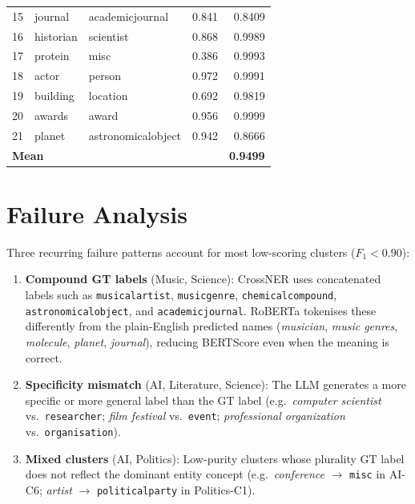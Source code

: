 \documentclass[11pt,a4paper]{article}
\begin{document}
\begin{table}[ht]
\begin{tabular}{r l l r r}
  15 & journal                        & academicjournal        & 0.841 & \cellcolor{red!15}0.8409 \\
  16 & historian                      & scientist              & 0.868 & \cellcolor{green!15}0.9989 \\
  17 & protein                        & misc                   & 0.386 & \cellcolor{green!15}0.9993 \\
  18 & actor                          & person                 & 0.972 & \cellcolor{green!15}0.9991 \\
  19 & building                       & location               & 0.692 & \cellcolor{yellow!25}0.9819 \\
  20 & awards                         & award                  & 0.956 & \cellcolor{green!15}0.9999 \\
  21 & planet                         & astronomicalobject     & 0.942 & \cellcolor{red!15}0.8666 \\
\midrule
\multicolumn{3}{l}{\textbf{Mean}} & & \textbf{0.9499} \\
\bottomrule
\end{tabular}
\end{table}

\FloatBarrier

\section{Failure Analysis}

Three recurring failure patterns account for most low-scoring clusters ($F_1 < 0.90$):

\begin{enumerate}
  \item \textbf{Compound GT labels} (Music, Science): CrossNER uses concatenated labels
        such as \texttt{musicalartist}, \texttt{musicgenre}, \texttt{chemicalcompound},
        \texttt{astronomicalobject}, and \texttt{academicjournal}.
        RoBERTa tokenises these differently from the plain-English predicted names
        (\textit{musician}, \textit{music genres}, \textit{molecule}, \textit{planet},
        \textit{journal}), reducing BERTScore even when the meaning is correct.

  \item \textbf{Specificity mismatch} (AI, Literature, Science): The LLM generates a
        more specific or more general label than the GT label
        (e.g.\ \textit{computer scientist} vs.\ \texttt{researcher};
        \textit{film festival} vs.\ \texttt{event};
        \textit{professional organization} vs.\ \texttt{organisation}).

  \item \textbf{Mixed clusters} (AI, Politics): Low-purity clusters whose plurality
        GT label does not reflect the dominant entity concept
        (e.g.\ \textit{conference} $\to$ \texttt{misc} in AI-C6;
        \textit{artist} $\to$ \texttt{politicalparty} in Politics-C1).
\end{enumerate}
\end{document}
